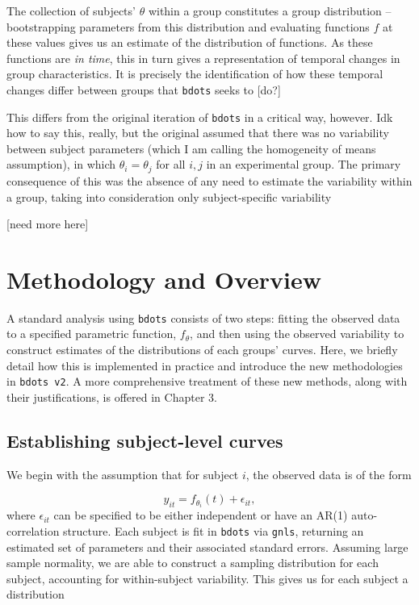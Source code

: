 \documentclass{article}
\newcommand{\xt}{\texttt}%
\begin{document}
The collection of subjects' $\theta$  within a group constitutes a group distribution -- bootstrapping parameters from this distribution and evaluating functions $f$ at these values gives us an estimate of the distribution of functions. As these functions are \textit{in time}, this in turn gives a representation of temporal changes in group characteristics. It is precisely the identification of how these temporal changes differ between groups that \xt{bdots} seeks to [do?]

This differs from the original iteration of \xt{bdots} in a critical way, however. Idk how to say this, really, but the original assumed that there was no variability between subject parameters (which I am calling the homogeneity of means assumption), in which $\theta_i = \theta_j$ for all $i,j$ in an experimental group. The primary consequence of this was the absence of any need to estimate the variability within a group, taking into consideration only subject-specific variability

[need more here]


\section{Methodology and Overview} 

A standard analysis using \xt{bdots} consists of two steps: fitting the observed data to a specified parametric function, $f_\theta$, and then using the observed variability to construct estimates of the distributions of each groups' curves.  Here, we briefly detail how this is implemented in practice and introduce the new methodologies in \xt{bdots v2}. A more comprehensive treatment of these new methods, along with their justifications, is offered in Chapter 3. 



\subsection{Establishing subject-level curves}

We begin with the assumption that for subject $i$, the observed data is of the form

\begin{equation}\label{eq:mean_structure}
y_{it} = f_{\theta_i}(t) + \epsilon_{it},
\end{equation}
where $\epsilon_{it}$ can be specified to be either independent or have an AR(1) auto-correlation structure. Each subject is fit in \xt{bdots} via \xt{gnls}, returning an estimated set of parameters and their associated standard errors. Assuming large sample normality, we are able to construct a sampling distribution for each subject, accounting for within-subject variability. This gives us for each subject a distribution
\end{document}

